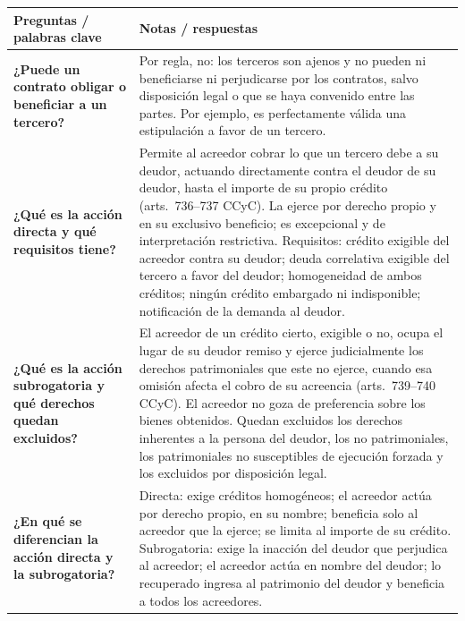 \documentclass[12pt,oneside]{book}
\begin{document}
\begin{table}[H]
\centering
\small
\renewcommand{\arraystretch}{1.3}
\begin{tabularx}{\textwidth}{
    >{\raggedright\arraybackslash}p{}
    >{\raggedright\arraybackslash}X
}
\toprule
\textbf{Preguntas / palabras clave} &
\textbf{Notas / respuestas} \\
\midrule

\textbf{¿Puede un contrato obligar o beneficiar a un tercero?} &
Por regla, no: los terceros son ajenos y no pueden ni beneficiarse ni perjudicarse por los contratos, salvo disposición legal o que se haya convenido entre las partes. Por ejemplo, es perfectamente válida una estipulación a favor de un tercero. \\

\midrule

\textbf{¿Qué es la acción directa y qué requisitos tiene?} &
Permite al acreedor cobrar lo que un tercero debe a su deudor, actuando directamente contra el deudor de su deudor, hasta el importe de su propio crédito (arts.~736--737 CCyC). La ejerce por derecho propio y en su exclusivo beneficio; es excepcional y de interpretación restrictiva. Requisitos: crédito exigible del acreedor contra su deudor; deuda correlativa exigible del tercero a favor del deudor; homogeneidad de ambos créditos; ningún crédito embargado ni indisponible; notificación de la demanda al deudor. \\

\midrule

\textbf{¿Qué es la acción subrogatoria y qué derechos quedan excluidos?} &
El acreedor de un crédito cierto, exigible o no, ocupa el lugar de su deudor remiso y ejerce judicialmente los derechos patrimoniales que este no ejerce, cuando esa omisión afecta el cobro de su acreencia (arts.~739--740 CCyC). El acreedor no goza de preferencia sobre los bienes obtenidos. Quedan excluidos los derechos inherentes a la persona del deudor, los no patrimoniales, los patrimoniales no susceptibles de ejecución forzada y los excluidos por disposición legal. \\

\midrule

\textbf{¿En qué se diferencian la acción directa y la subrogatoria?} &
Directa: exige créditos homogéneos; el acreedor actúa por derecho propio, en su nombre; beneficia solo al acreedor que la ejerce; se limita al importe de su crédito. Subrogatoria: exige la inacción del deudor que perjudica al acreedor; el acreedor actúa en nombre del deudor; lo recuperado ingresa al patrimonio del deudor y beneficia a todos los acreedores. \\


\end{tabularx}
\end{table}
\end{document}
